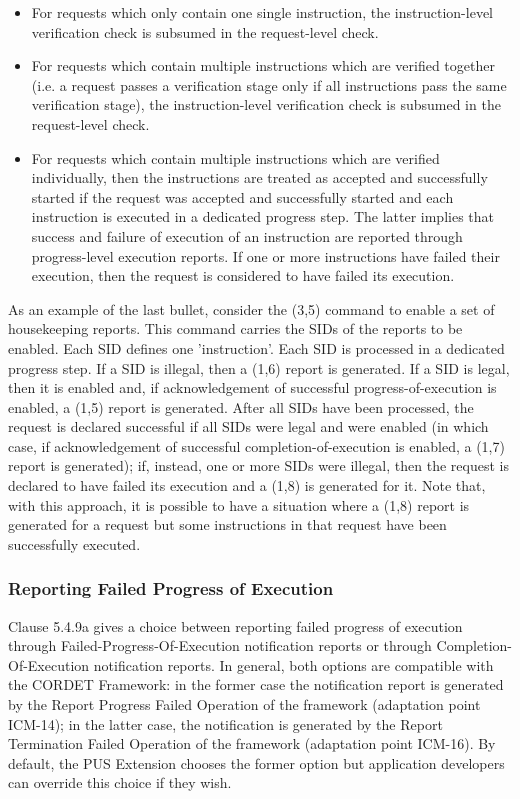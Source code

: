 \documentclass{pnp_article}
\begin{document}
\begin{itemize}
\item For requests which only contain one single instruction, the instruction-level verification check is subsumed in the request-level check.
\item For requests which contain multiple instructions which are verified together (i.e. a request passes a verification stage only if all instructions pass the same verification stage), the instruction-level verification check is subsumed in the request-level check.
\item For requests which contain multiple instructions which are verified individually, then the instructions are treated as accepted and successfully started if the request was accepted and successfully started and each instruction is executed in a dedicated progress step. The latter implies that success and failure of execution of an instruction are reported through progress-level execution reports. If one or more instructions have failed their execution, then the request is considered to have failed its execution.
\end{itemize}

As an example of the last bullet, consider the (3,5) command to enable a set of housekeeping reports. This command carries the SIDs of the reports to be enabled. Each SID defines one 'instruction'. Each SID is processed in a dedicated progress step. If a SID is illegal, then a (1,6) report is generated. If a SID is legal, then it is enabled and, if acknowledgement of successful progress-of-execution is enabled, a (1,5) report is generated. After all SIDs have been processed, the request is declared successful if all SIDs were legal and were enabled (in which case, if acknowledgement of successful completion-of-execution is enabled, a (1,7) report is generated); if, instead, one or more SIDs were illegal, then the request is declared to have failed its execution and a (1,8) is generated for it. Note that, with this approach, it is possible to have a situation where a (1,8) report is generated for a request but some instructions in that request have been successfully executed. 

\subsubsection{Reporting Failed Progress of Execution}
Clause 5.4.9a gives a choice between reporting failed progress of execution through Failed-Progress-Of-Execution notification reports or through Completion-Of-Execution notification reports. In general, both options are compatible with the CORDET Framework: in the former case the notification report is generated by the Report Progress Failed Operation of the framework (adaptation point ICM-14); in the latter case, the notification is generated by the Report Termination Failed Operation of the framework (adaptation point ICM-16). By default, the PUS Extension chooses the former option but application developers can override this choice if they wish.
\end{document}
